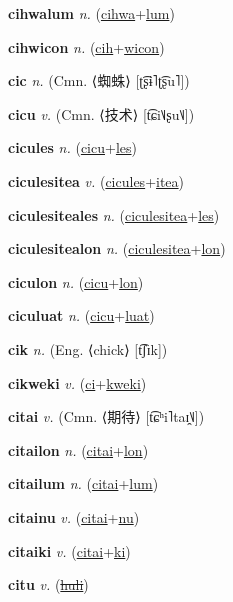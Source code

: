 \textbf{\hypertarget{cihwalum}{cihwalum}} \textit{n.} (\hyperlink{cihwa}{cihwa}+\allowbreak \hyperlink{lum}{lum})


\textbf{\hypertarget{cihwicon}{cihwicon}} \textit{n.} (\hyperlink{cih}{cih}+\allowbreak \hyperlink{wicon}{wicon})


\textbf{\hypertarget{cic}{cic}} \textit{n.} (Cmn. ⟨{\chinese{}蜘蛛}⟩ [ʈ͡ʂɨ˥ʈ͡ʂu˥])


\textbf{\hypertarget{cicu}{cicu}} \textit{v.} (Cmn. ⟨{\chinese{}技术}⟩ [t͡ɕi˥˩ʂu˥˩])


\textbf{\hypertarget{cicules}{cicules}} \textit{n.} (\hyperlink{cicu}{cicu}+\allowbreak \hyperlink{les}{les})


\textbf{\hypertarget{ciculesitea}{ciculesitea}} \textit{v.} (\hyperlink{cicules}{cicules}+\allowbreak \hyperlink{itea}{itea})


\textbf{\hypertarget{ciculesiteales}{ciculesiteales}} \textit{n.} (\hyperlink{ciculesitea}{ciculesitea}+\allowbreak \hyperlink{les}{les})


\textbf{\hypertarget{ciculesitealon}{ciculesitealon}} \textit{n.} (\hyperlink{ciculesitea}{ciculesitea}+\allowbreak \hyperlink{lon}{lon})


\textbf{\hypertarget{ciculon}{ciculon}} \textit{n.} (\hyperlink{cicu}{cicu}+\allowbreak \hyperlink{lon}{lon})


\textbf{\hypertarget{ciculuat}{ciculuat}} \textit{n.} (\hyperlink{cicu}{cicu}+\allowbreak \hyperlink{luat}{luat})


\textbf{\hypertarget{cik}{cik}} \textit{n.} (Eng. ⟨chick⟩ [t͡ʃɪk])


\textbf{\hypertarget{cikweki}{cikweki}} \textit{v.} (\hyperlink{ci}{ci}+\allowbreak \hyperlink{kweki}{kweki})


\textbf{\hypertarget{citai}{citai}} \textit{v.} (Cmn. ⟨{\chinese{}期待}⟩ [t͡ɕʰi˥taɪ̯˥˩])


\textbf{\hypertarget{citailon}{citailon}} \textit{n.} (\hyperlink{citai}{citai}+\allowbreak \hyperlink{lon}{lon})


\textbf{\hypertarget{citailum}{citailum}} \textit{n.} (\hyperlink{citai}{citai}+\allowbreak \hyperlink{lum}{lum})


\textbf{\hypertarget{citainu}{citainu}} \textit{v.} (\hyperlink{citai}{citai}+\allowbreak \hyperlink{nu}{nu})


\textbf{\hypertarget{citaiki}{citaiki}} \textit{v.} (\hyperlink{citai}{citai}+\allowbreak \hyperlink{ki}{ki})


\textbf{\hypertarget{citu}{citu}} \textit{v.} (\hyperlink{huli}{\sout{huli}})


